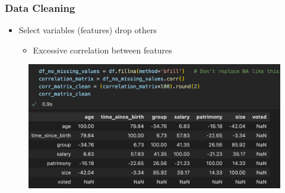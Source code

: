\begin{frame}\frametitle{Data Cleaning}
   \begin{itemize}
      \item Select variables (features) drop others
      \begin{itemize}
         \item Excessive correlation between features
      \end{itemize}
   \end{itemize}
   \vspace{.5cm}
   \begin{figure}[H]
      \includegraphics[scale=.35]{../images/illustrations/data_cleaning_compute_corr.png}
   \end{figure}
\end{frame}


